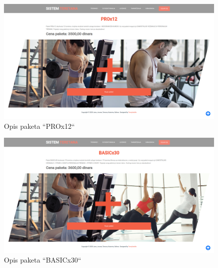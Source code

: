 \documentclass[../main.tex]{subfiles}
\begin{document}
\begin{figure}[!ht]
\begin{center}
\includegraphics[scale=0.22]{sections/korisnicki_interfejs/screenshots/paket_prox12_opis_i_kupovina_paketa.png}
\end{center}
\caption{Opis paketa ``PROx12``}
\label{fig:paket_p_12}
\end{figure}

\begin{figure}[!ht]
\begin{center}
\includegraphics[scale=0.22]{sections/korisnicki_interfejs/screenshots/paket_basicx30_opis_i_kupovina_paketa.png}
\end{center}
\caption{Opis paketa ``BASICx30``}
\label{fig:paket_b_30}
\end{figure}
\end{document}
